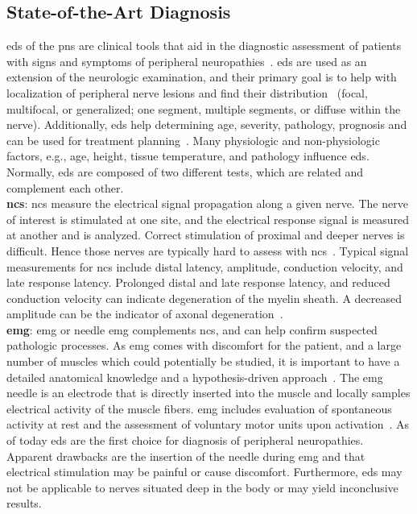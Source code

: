 \subsection{State-of-the-Art Diagnosis}
\gls{eds} of the \gls{pns} are clinical tools that aid in the diagnostic assessment of patients with signs and symptoms of peripheral neuropathies~\cite{Mohassel2015}. \gls{eds} are used as an extension of the neurologic examination, and their primary goal is to help with localization of peripheral nerve lesions and find their distribution~\cite{Mohassel2015} (focal, multifocal, or generalized; one segment, multiple segments, or diffuse within the nerve). Additionally, \gls{eds} help determining age, severity, pathology, prognosis and can be used for treatment planning~\cite{Mohassel2015}. Many physiologic and non-physiologic factors, e.g., age, height, tissue temperature, and pathology influence \gls{eds}. Normally, \gls{eds} are composed of two different tests, which are related and complement each other.\\
\textbf{\gls{ncs}}: \gls{ncs} measure the electrical signal propagation along a given nerve. The nerve of interest is stimulated at one site, and the electrical response signal is measured at another and is analyzed. Correct stimulation of proximal and deeper nerves is difficult. Hence those nerves are typically hard to assess with \gls{ncs}~\cite{Mohassel2015}. Typical signal measurements for \gls{ncs} include distal latency, amplitude, conduction velocity, and late response latency. Prolonged distal and late response latency, and reduced conduction velocity can indicate degeneration of the myelin sheath. A decreased amplitude can be the indicator of axonal degeneration~\cite{Mohassel2015}.\\
\textbf{\gls{emg}}: \gls{emg} or needle {emg} complements \gls{ncs}, and can help confirm suspected pathologic processes. As \gls{emg} comes with discomfort for the patient, and a large number of muscles which could potentially be studied, it is important to have a detailed anatomical knowledge and a hypothesis-driven approach~\cite{Mohassel2015}. The \gls{emg} needle is an electrode that is directly inserted into the muscle and locally samples electrical activity of the muscle fibers. \gls{emg} includes evaluation of spontaneous activity at rest and the assessment of voluntary motor units upon activation~\cite{Mohassel2015}.
As of today \gls{eds} are the first choice for diagnosis of peripheral neuropathies. Apparent drawbacks are the insertion of the needle during \gls{emg} and that electrical stimulation may be painful or cause discomfort. Furthermore, \gls{eds} may not be applicable to nerves situated deep in the body or may yield inconclusive results.

